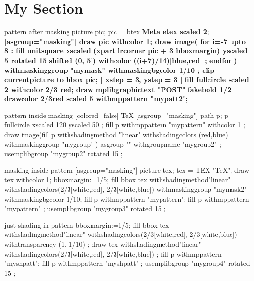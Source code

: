 \documentclass[a4paper]{article}
\begin{document}
\section{My Section}\label{sec:my_section}

pattern after masking
\mpfig*
  picture pic; pic = btex \sffamily\bfseries\Huge Meta etex scaled 2;
\endmpfig
{}[asgroup="masking"]
  \mpfig[off,externalizedependson=-1]
    draw pic withcolor 1;
  \endmpfig
\endmplibgroup
\mpfig[alt=test general masking,externalizedependson=-2]
  draw image(
    for i=-7 upto 8 :
      fill unitsquare
      xscaled (xpart lrcorner pic + 3 bboxmargin)
      yscaled 5
      rotated 15
      shifted (0, 5i)
      withcolor ((i+7)/14)[blue,red] ;
    endfor
  ) withmaskinggroup "mymask"
    withmaskingbgcolor 1/10 ;
  clip currentpicture to bbox pic;
\endmpfig
{}[ xstep = 3, ystep = 3 ]
\mpfig[off]
fill fullcircle scaled 2 withcolor 2/3 red;
\endmpfig
\endmppattern
\mpfig
draw mplibgraphictext "\bfseries POST" fakebold 1/2 drawcolor 2/3red scaled 5
withmppattern "mypatt2";
\endmpfig

pattern inside masking
[colored=false]
\SuspendTagging\relax
\tiny\TeX
\endmppattern
{}[asgroup="masking"]
\mpfig[off]
path p; p = fullcircle xscaled 120 yscaled 50 ;
fill p withmppattern "mypattern" withcolor 1 ;
\endmpfig
\endmplibgroup
\mpfig
draw image(fill p
  withshadingmethod "linear" withshadingcolors (red,blue)
  withmaskinggroup "mygroup"
) asgroup "" withgroupname "mygroup2" ;
\endmpfig
\mpfig
usemplibgroup "mygroup2" rotated 15 ;
\endmpfig

masking inside pattern
[asgroup="masking"]
\mpfig[off]
picture tex;
tex = TEX "\tiny\TeX";
draw tex withcolor 1;
\endmpfig
\endmplibgroup
{}
\mpfig[off]
bboxmargin:=1/5;
fill bbox tex
  withshadingmethod"linear" withshadingcolors(2/3[white,red], 2/3[white,blue])
  withmaskinggroup "mymask2" withmaskingbgcolor 1/10;
\endmpfig
\endmppattern
\mpfig
fill p withmppattern "mypattern";
\endmpfig
{}
\mpfig[off]
fill p withmppattern "mypattern" ;
\endmpfig
\endmplibgroup
\mpfig
usemplibgroup "mygroup3" rotated 15 ;
\endmpfig

just shading in pattern
\mpfig[off]
bboxmargin:=1/5;
fill bbox tex
withshadingmethod"linear" withshadingcolors(2/3[white,red], 2/3[white,blue])
withtransparency (1, 1/10)
;
draw tex
withshadingmethod"linear" withshadingcolors(2/3[white,red], 2/3[white,blue]) ;
\endmpfig
\endmppattern
\mpfig
fill p withmppattern "myshpatt";
\endmpfig
{}
\mpfig[off]
fill p withmppattern "myshpatt" ;
\endmpfig
\endmplibgroup
\mpfig
usemplibgroup "mygroup4" rotated 15 ;
\endmpfig
\end{document}

